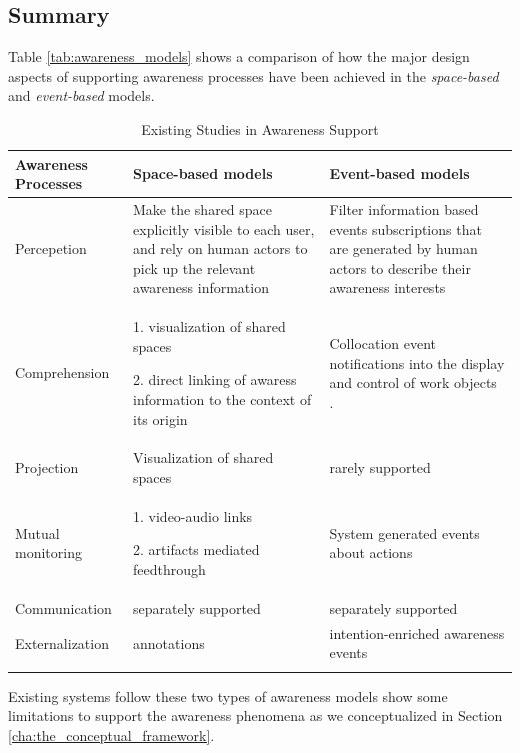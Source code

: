 \subsection{Summary} %
\label{sub:summary}
Table \ref{tab:awareness_models} shows a comparison of how the major design aspects of supporting awareness processes have been achieved in the \emph{space-based} and \emph{event-based} models.

{\footnotesize
\begin{longtable}{>{\raggedright}p{1.1in}>{\raggedright}p{2.2in}>{\raggedright}p{2.2in}}
\toprule 
\textbf{Awareness Processes} & \textbf{Space-based models} & \textbf{Event-based models}\tabularnewline
\midrule 
Percepetion & Make the shared space explicitly visible to each user, and rely on
human actors to pick up the relevant awareness information  & Filter information based events subscriptions that are generated by
human actors to describe their awareness interests\tabularnewline
\midrule 
Comprehension & 1. visualization of shared spaces

2. direct linking of awaress information to the context of its origin & Collocation event notifications into the display and control of work
objects \cite{prinz1999a,carroll2003a}.\tabularnewline
\midrule 
Projection & Visualization of shared spaces & rarely supported\tabularnewline
\midrule 
Mutual monitoring & 1. video-audio links \cite{Dourish1992}

2. artifacts mediated feedthrough \cite{Tee2009} & System generated events about actions \cite{Fuchs1995}\tabularnewline
\midrule 
Communication & separately supported & separately supported\tabularnewline
\midrule 
Externalization & annotations \cite{Zheng2006,Weng2004} & intention-enriched awareness events \cite{Rittenbruch2007}\tabularnewline
\bottomrule
\caption{Existing Studies in Awareness Support}
\label{tab:existing_studies}

\end{longtable}
}

Existing systems follow these two types of awareness models show some limitations to support the awareness phenomena as we conceptualized in Section \ref{cha:the_conceptual_framework}. 

